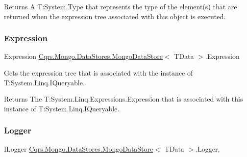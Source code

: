 \begin{DoxyReturn}{Returns}
A T\+:\+System.\+Type that represents the type of the element(s) that are returned when the expression tree associated with this object is executed. 
\end{DoxyReturn}
\mbox{\label{classCqrs_1_1Mongo_1_1DataStores_1_1MongoDataStore_a1a151694ae4eef805bd64aa7a3ae70ed_a1a151694ae4eef805bd64aa7a3ae70ed}} 
\subsubsection{\texorpdfstring{Expression}{Expression}}
{\footnotesize\ttfamily Expression \hyperlink{classCqrs_1_1Mongo_1_1DataStores_1_1MongoDataStore}{Cqrs.\+Mongo.\+Data\+Stores.\+Mongo\+Data\+Store}$<$ T\+Data $>$.Expression\hspace{0.3cm}{\ttfamily [get]}}



Gets the expression tree that is associated with the instance of T\+:\+System.\+Linq.\+I\+Queryable. 

\begin{DoxyReturn}{Returns}
The T\+:\+System.\+Linq.\+Expressions.\+Expression that is associated with this instance of T\+:\+System.\+Linq.\+I\+Queryable. 
\end{DoxyReturn}
\mbox{\label{classCqrs_1_1Mongo_1_1DataStores_1_1MongoDataStore_a29e943482b60be2d3d253af59d3fc5eb_a29e943482b60be2d3d253af59d3fc5eb}} 
\subsubsection{\texorpdfstring{Logger}{Logger}}
{\footnotesize\ttfamily I\+Logger \hyperlink{classCqrs_1_1Mongo_1_1DataStores_1_1MongoDataStore}{Cqrs.\+Mongo.\+Data\+Stores.\+Mongo\+Data\+Store}$<$ T\+Data $>$.Logger\hspace{0.3cm}{\ttfamily [get]}, {\ttfamily [protected]}}



